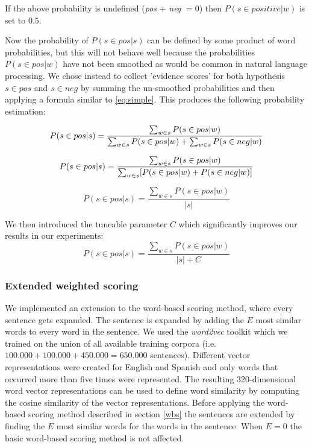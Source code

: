 \documentclass[11pt]{article}
\begin{document}
If the above probability is undefined (\textit{pos} + \textit{neg} $= 0$) then $P(s\in positive | w)$ is set to $0.5$.

Now the probability of $P(s\in pos | s)$ can be defined by some product of word probabilities, but this will not behave well because the probabilities $P(s\in pos | w)$ have not been smoothed as would be common in natural language processing. We chose instead to collect 'evidence scores' for both hypothesis $s\in pos$ and $s\in neg$ by summing the un-smoothed probabilities and then applying a formula similar to \ref{eq:simple}. This produces the following probability estimation:

\begin{dmath} P(s\in pos | s)  = \\ \frac{\sum_{w\in s} P(s\in pos | w)}{\sum_{w\in s} P(s\in pos | w) + \sum_{w\in s} P(s\in neg | w)} \end{dmath}

\begin{dmath} P(s\in pos | s)  = \\ \frac{\sum_{w\in s} P(s\in pos | w)}{\sum_{w\in s} [ P(s\in pos | w) + P(s\in neg | w) ]}  \end{dmath}

\begin{equation} P(s\in pos | s)  = \frac{\sum_{w\in s} P(s\in pos | w)}{ | s | }  \end{equation}

We then introduced the tuneable parameter $C$ which significantly improves our results in our experiments:
\begin{equation} P(s\in pos | s)  = \frac{\sum_{w\in s} P(s\in pos | w)}{ | s | + C}  \end{equation}



\subsubsection{Extended weighted scoring}
We implemented an extension to the word-based scoring method, where every sentence gets expanded. The sentence is expanded by adding the $E$ most similar words to every word in the sentence. We used the \textit{word2vec} toolkit \cite{word2vec} which we trained on the union of all available training corpora (i.e. $100.000 + 100.000 + 450.000 = 650.000$ sentences). Different vector representations were created for English and Spanish and only words that occurred more than five times were represented. The resulting 320-dimensional word vector representations can be used to define word similarity by computing the cosine similarity of the vector representations. 
Before applying the word-based scoring method described in section \ref{wbs} the sentences are extended by finding the $E$ most similar words for the words in the sentence. When $E=0$ the basic word-based scoring method is not affected.
\end{document}
